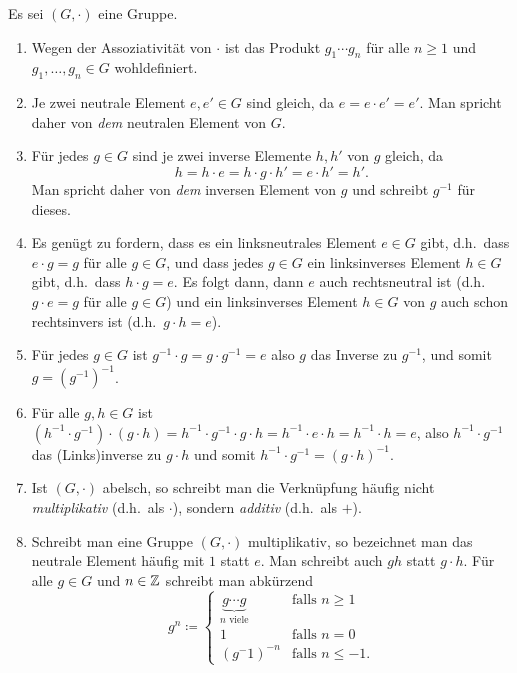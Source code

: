 \begin{bem} Es sei $(G, \cdot)$ eine Gruppe.
 \begin{enumerate}[leftmargin=*]
  \item
   Wegen der Assoziativität von $\cdot$ ist das Produkt $g_1 \dotsm g_n$ für alle $n \geq 1$ und $g_1, \dotsc, g_n \in G$ wohldefiniert.
  \item
   Je zwei neutrale Element $e, e' \in G$ sind gleich, da $e = e \cdot e' = e'$. Man spricht daher von \emph{dem} neutralen Element von $G$.
  \item
   Für jedes $g \in G$ sind je zwei inverse Elemente $h, h'$ von $g$ gleich, da
   \[
    h = h \cdot e = h \cdot g \cdot h' = e \cdot h' = h'.
   \]
   Man spricht daher von \emph{dem} inversen Element von $g$ und schreibt $g^{-1}$ für dieses.
  \item
   Es genügt zu fordern, dass es ein linksneutrales Element $e \in G$ gibt, d.h.\ dass $e \cdot g = g$ für alle $g \in G$, und dass jedes $g \in G$ ein linksinverses Element $h \in G$ gibt, d.h.\ dass $h \cdot g = e$. Es folgt dann, dann $e$ auch rechtsneutral ist (d.h.\ $g \cdot e = g$ für alle $g \in G$) und ein linksinverses Element $h \in G$ von $g$ auch schon rechtsinvers ist (d.h.\ $g \cdot h = e$).
  \item
   Für jedes $g \in G$ ist $g^{-1} \cdot g = g \cdot g^{-1} = e$ also $g$ das Inverse zu $g^{-1}$, und somit $g = (g^{-1})^{-1}$.
  \item
   Für alle $g, h \in G$ ist $(h^{-1} \cdot g^{-1}) \cdot (g \cdot h) = h^{-1} \cdot g^{-1} \cdot g \cdot h = h^{-1} \cdot e \cdot h = h^{-1} \cdot h = e$, also $h^{-1} \cdot g^{-1}$ das (Links)inverse zu $g \cdot h$ und somit $h^{-1} \cdot g^{-1} = (g \cdot h)^{-1}$.
  \item
   Ist $(G, \cdot)$ abelsch, so schreibt man die Verknüpfung häufig nicht \emph{multiplikativ} (d.h.\ als $\cdot$), sondern \emph{additiv} (d.h.\ als $+$).
  \item
   Schreibt man eine Gruppe $(G,\cdot)$ multiplikativ, so bezeichnet man das neutrale Element häufig mit $1$ statt $e$. Man schreibt auch $gh$ statt $g \cdot h$. Für alle $g \in G$ und $n \in \mathbb{Z}$ schreibt man abkürzend
   \[
    g^n \coloneqq
    \begin{cases}
     \underbrace{g \dotsm g}_{\text{$n$ viele}} & \text{falls $n \geq 1$} \\
     1                                          & \text{falls $n = 0$} \\
     (g^-1)^{-n}                                & \text{falls $n \leq -1$}.

\end{cases}\]
\end{enumerate}
\end{bem}
